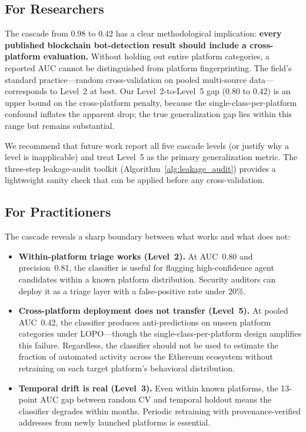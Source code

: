 \documentclass[sigconf,nonacm=false]{acmart}
\begin{document}
\subsection{For Researchers}

The cascade from 0.98 to 0.42 has a clear methodological implication: \textbf{every published blockchain bot-detection result should include a cross-platform evaluation.} Without holding out entire platform categories, a reported AUC cannot be distinguished from platform fingerprinting. The field's standard practice---random cross-validation on pooled multi-source data---corresponds to Level~2 at best. Our Level~2-to-Level~5 gap (0.80 to 0.42) is an upper bound on the cross-platform penalty, because the single-class-per-platform confound inflates the apparent drop; the true generalization gap lies within this range but remains substantial.

We recommend that future work report all five cascade levels (or justify why a level is inapplicable) and treat Level~5 as the primary generalization metric. The three-step leakage-audit toolkit (Algorithm~\ref{alg:leakage_audit}) provides a lightweight sanity check that can be applied before any cross-validation.

\subsection{For Practitioners}

The cascade reveals a sharp boundary between what works and what does not:

\begin{itemize}
    \item \textbf{Within-platform triage works (Level~2).} At AUC~0.80 and precision~0.81, the classifier is useful for flagging high-confidence agent candidates within a known platform distribution. Security auditors can deploy it as a triage layer with a false-positive rate under 20\%.
    \item \textbf{Cross-platform deployment does not transfer (Level~5).} At pooled AUC~0.42, the classifier produces anti-predictions on unseen platform categories under LOPO---though the single-class-per-platform design amplifies this failure. Regardless, the classifier should not be used to estimate the fraction of automated activity across the Ethereum ecosystem without retraining on each target platform's behavioral distribution.
    \item \textbf{Temporal drift is real (Level~3).} Even within known platforms, the 13-point AUC gap between random CV and temporal holdout means the classifier degrades within months. Periodic retraining with provenance-verified addresses from newly launched platforms is essential.
\end{itemize}
\end{document}
